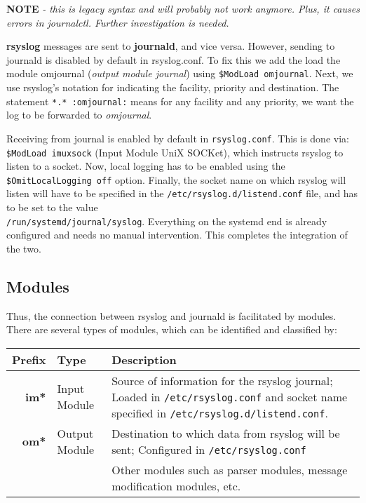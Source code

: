 \noindent
\textbf{NOTE} \textit{- this is legacy syntax and will probably not work anymore. Plus, it causes errors in journalctl. Further investigation is needed.} 

\noindent
\textbf{rsyslog} messages are sent to \textbf{journald}, and vice versa. However, sending to journald is disabled by default in rsyslog.conf. To fix this we add the load the module omjournal (\textit{output module journal}) using \verb|$ModLoad omjournal|. Next, we use rsyslog's notation for indicating the facility, priority and destination. The statement \verb|*.* :omjournal:| means for any facility and any priority, we want the log to be forwarded to \textit{omjournal}. 

Receiving from journal is enabled by default in \verb|rsyslog.conf|. This is done via: \\\verb|$ModLoad imuxsock| (Input Module UniX SOCKet), which instructs rsyslog to listen to a socket. Now, local logging has to be enabled using the \verb|$OmitLocalLogging off| option. Finally, the socket name on which rsyslog will listen will have to be specified in the \verb|/etc/rsyslog.d/listend.conf| file, and has to be set to the value \\\verb|/run/systemd/journal/syslog|. Everything on the systemd end is already configured and needs no manual intervention. This completes the integration of the two. 

\subsection{Modules}
Thus, the connection between rsyslog and journald is facilitated by modules. There are several types of modules, which can be identified and classified by:

\noindent
\begin{tabular}{rlM{0.67}}
	\toprule
	\textbf{Prefix} &\textbf{Type} &\textbf{Description} \\
	\midrule
	\textbf{im*} &Input Module &Source of information for the rsyslog journal; Loaded in \verb|/etc/rsyslog.conf| and socket name specified in \verb|/etc/rsyslog.d/listend.conf|. \\
	\midrule
	\textbf{om*} &Output Module &Destination to which data from rsyslog will be sent; Configured in \verb|/etc/rsyslog.conf| \\
	\midrule
	&&Other modules such as parser modules, message modification modules, etc. \\
	\bottomrule
\end{tabular}


